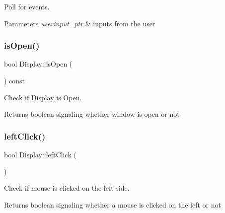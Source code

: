 Poll for events. 


\begin{DoxyParams}{Parameters}
{\em userinput\+\_\+ptr} & inputs from the user \\
\hline
\end{DoxyParams}
\mbox{\label{class_display_a45a76d7780b8b35251a4510849cd58e8}} 
\subsubsection{\texorpdfstring{is\+Open()}{isOpen()}}
{\footnotesize\ttfamily bool Display\+::is\+Open (\begin{DoxyParamCaption}{ }\end{DoxyParamCaption}) const\hspace{0.3cm}{\ttfamily [inline]}}



Check if \mbox{\hyperlink{class_display}{Display}} is Open. 

\begin{DoxyReturn}{Returns}
boolean signaling whether window is open or not 
\end{DoxyReturn}
\mbox{\label{class_display_a1b81707d811188dbfd98be312679223f}} 
\subsubsection{\texorpdfstring{left\+Click()}{leftClick()}}
{\footnotesize\ttfamily bool Display\+::left\+Click (\begin{DoxyParamCaption}{ }\end{DoxyParamCaption})\hspace{0.3cm}{\ttfamily [inline]}}



Check if mouse is clicked on the left side. 

\begin{DoxyReturn}{Returns}
boolean signaling whether a mouse is clicked on the left or not 
\end{DoxyReturn}
\mbox{\label{class_display_a2d8a021131e48ba0388c24754dd5286c}} 
